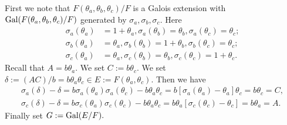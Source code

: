 \documentclass[12pt,leqno]{amsart}
\theoremstyle{plain}
\theoremstyle{definition}
\begin{document}
First we note that  $F(\theta_{a},\theta_{b},\theta_{c})/F$ is a Galois extension with ${\rm Gal}(F(\theta_{a},\theta_{b},\theta_{c})/F)$ generated by $\sigma_a,\sigma_b,\sigma_c$. Here
\[
\begin{aligned}
\sigma_a(\theta_{a})&=1+ \theta_{a}, \sigma_a(\theta_{b})=\theta_{b}, \sigma_a(\theta_{c})=\theta_{c};\\
\sigma_b(\theta_{a})&=\theta_{a}, \sigma_b(\theta_{b})=1+ \theta_{b}, \sigma_b(\theta_{c})= \theta_{c};\\
\sigma_c(\theta_{a})&=\theta_{a}, \sigma_c(\theta_{b})=\theta_{b}, \sigma_c(\theta_{c})=1+ \theta_{c}.
\end{aligned}
\]
Recall that $A=b\theta_a$. We set $C:= b\theta_c$. 
We set $\delta:=(AC)/b=b\theta_a\theta_c \in E:=F(\theta_a,\theta_c)$. Then we have
\[
\begin{aligned}
\sigma_a(\delta)-\delta =b\sigma_a(\theta_a)\sigma_a(\theta_c)-b\theta_a\theta_c= b[\sigma_a(\theta_a)-\theta_a]\theta_c=b\theta_c=C,\\
\sigma_c(\delta)-\delta =b\sigma_c(\theta_a)\sigma_c(\theta_c)-b\theta_a\theta_c= b\theta_a[\sigma_c(\theta_c)-\theta_c]=b\theta_a=A.
\end{aligned}
\]
Finally set $G :={\rm Gal}(E/F).$
\end{document}
